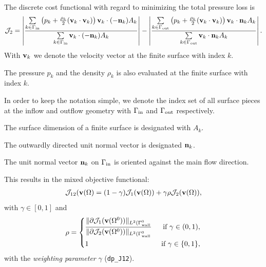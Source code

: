 \documentclass[a4paper,oneside]{book}
\numberwithin{equation}{section}
\begin{document}
The discrete cost functional with regard to minimizing the total pressure loss is
\begin{align}
\label{discrete cost functional J2}
\mathcal{J}_2 = \left|\frac{\sum\limits_{k\in\Gamma_{\rm in}} \left(p_k + \frac{\rho_k}{2}({\bf v}_k\cdot{\bf v}_k)\right){\bf v}_k\cdot(-{\bf n}_k)A_k}{\sum\limits_{k\in\Gamma_{\rm in}} {\bf v}_k\cdot(-{\bf n}_k)A_k}\right| - \left|\frac{\sum\limits_{k\in\Gamma_{\rm out}} \left(p_k + \frac{\rho_k}{2}({\bf v}_k\cdot{\bf v}_k)\right){\bf v}_k\cdot{\bf n}_kA_k}{\sum\limits_{k\in\Gamma_{\rm out}} {\bf v}_k\cdot{\bf n}_kA_k}\right|.
\end{align}
With ${\bf v}_k$ we denote the velocity vector at the finite surface with index $k$.

The pressure $p_k$ and the density $\rho_k$ is also evaluated at the finite surface with index $k$.

In order to keep the notation simple, we denote the index set of all surface pieces at the inflow and outflow geometry with $\Gamma_{\rm in}$ and $\Gamma_{\rm out}$ respectively.

The surface dimension of a finite surface is designated with $A_k$.

The outwardly directed unit normal vector is designated ${\bf n}_k$.

The unit normal vector ${\bf n}_k$ on $\Gamma_{\rm in}$ is oriented against the main flow direction.

This results in the mixed objective functional:
\begin{align}
\label{mixed cost functional}
\mathcal{J}_{12}({\bf v}(\Omega) = (1 - \gamma)\mathcal{J}_1({\bf v}(\Omega)) + \gamma\rho\mathcal{J}_2({\bf v}(\Omega)),
\end{align}
with $\gamma\in[0,1]$ and
\begin{equation*}
\rho = \left\{\begin{split}
& \frac{\|\partial\mathcal{J}_1({\bf v}(\Omega^0))\|_{L^2(\Gamma_{\rm wall}^0}}{\|\partial\mathcal{J}_2({\bf v}(\Omega^0))\|_{L^2(\Gamma_{\rm wall}^0}} &\mbox{ if } \gamma\in(0,1),\\
& 1 &\mbox{ if } \gamma\in\{0,1\},
\end{split}\right.
\end{equation*}
with the \textit{weighting parameter} $\gamma$ (\verb|dp_J12|).
\end{document}
